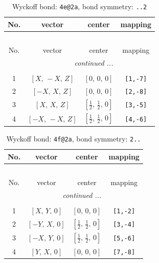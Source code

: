 \documentclass[fleqn,8pt]{jsarticle}
\begin{document}
\renewcommand{\arraystretch}{1.2}
\begin{longtable}{cccc}
\caption{Wyckoff bond: {\tt 4e@2a}, bond symmetry: {\tt ..2}}
 \\
 \hline \hline
No. & vector & center & mapping \\ \hline \endfirsthead

\multicolumn{3}{l}{\tablename\ \thetable{}} \\
 \hline \hline
No. & vector & center & mapping \\ \hline \endhead

 \hline \hline
\multicolumn{3}{r}{\footnotesize\it continued ...} \\ \endfoot

 \hline \hline
\multicolumn{3}{r}{} \\ \endlastfoot

1 & $\left[ X,\, - X,\, Z \right]$ & $\left[ 0,\, 0,\, 0 \right]$ & {\tt [1,-7]} \\ \hline
2 & $\left[ - X,\, X,\, Z \right]$ & $\left[ 0,\, 0,\, 0 \right]$ & {\tt [2,-8]} \\ \hline
3 & $\left[ X,\, X,\, Z \right]$ & $\left[ \frac{1}{2},\, \frac{1}{2},\, 0 \right]$ & {\tt [3,-5]} \\ \hline
4 & $\left[ - X,\, - X,\, Z \right]$ & $\left[ \frac{1}{2},\, \frac{1}{2},\, 0 \right]$ & {\tt [4,-6]} \\
\end{longtable}
\renewcommand{\arraystretch}{1.2}
\begin{longtable}{cccc}
\caption{Wyckoff bond: {\tt 4f@2a}, bond symmetry: {\tt 2..}}
 \\
 \hline \hline
No. & vector & center & mapping \\ \hline \endfirsthead

\multicolumn{3}{l}{\tablename\ \thetable{}} \\
 \hline \hline
No. & vector & center & mapping \\ \hline \endhead

 \hline \hline
\multicolumn{3}{r}{\footnotesize\it continued ...} \\ \endfoot

 \hline \hline
\multicolumn{3}{r}{} \\ \endlastfoot

1 & $\left[ X,\, Y,\, 0 \right]$ & $\left[ 0,\, 0,\, 0 \right]$ & {\tt [1,-2]} \\ \hline
2 & $\left[ - Y,\, X,\, 0 \right]$ & $\left[ \frac{1}{2},\, \frac{1}{2},\, 0 \right]$ & {\tt [3,-4]} \\ \hline
3 & $\left[ - X,\, Y,\, 0 \right]$ & $\left[ \frac{1}{2},\, \frac{1}{2},\, 0 \right]$ & {\tt [5,-6]} \\ \hline
4 & $\left[ Y,\, X,\, 0 \right]$ & $\left[ 0,\, 0,\, 0 \right]$ & {\tt [7,-8]} \\
\end{longtable}
\end{document}
